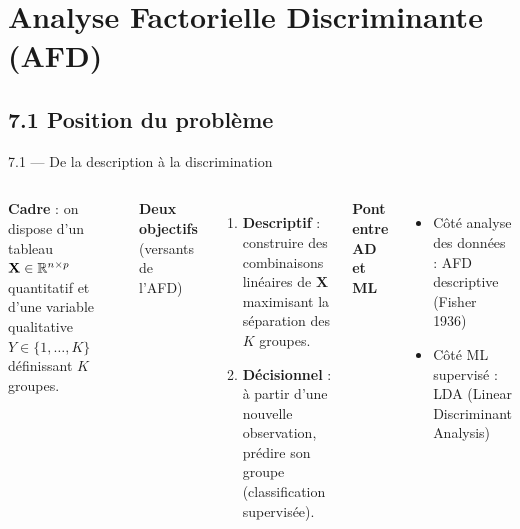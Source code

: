 \section{Analyse Factorielle Discriminante (AFD)}

\subsection{7.1 Position du problème}
\begin{frame}{7.1 — De la description à la discrimination}
\begin{columns}[T]
\textbf{Cadre} : on dispose d'un tableau $\mathbf{X} \in \mathbb{R}^{n \times p}$
\alert{quantitatif} et d'une variable qualitative $Y \in \{1, \ldots, K\}$
définissant $K$ groupes.

\textbf{Deux objectifs} (versants de l'AFD)
\begin{enumerate}
  \item \textbf{Descriptif} : construire des combinaisons linéaires de $\mathbf{X}$
        \alert{maximisant la séparation} des $K$ groupes.
  \item \textbf{Décisionnel} : à partir d'une nouvelle observation,
        \alert{prédire} son groupe (classification supervisée).
\end{enumerate}

\vspace{0.2cm}
\textbf{Pont entre AD et ML}
\begin{itemize}\small
  \item Côté \alert{analyse des données} : AFD descriptive (Fisher 1936)
  \item Côté \alert{ML supervisé} : LDA (Linear Discriminant Analysis)
\end{itemize}
\end{columns}
\end{frame}

